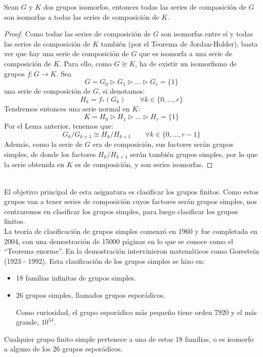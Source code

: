 \begin{prop}
    Sean $G$ y $K$ dos grupos isomorfos, entonces todas las series de composición de $G$ son isomorfas a todas las series de composición de $K$.
    \begin{proof}
        Como todas las series de composición de $G$ son isomorfas entre sí y todas las series de composición de $K$ también (por el Teorema de Jordan-Holder), basta ver que hay una serie de composición de $G$ que es isomorfa a una serie de composición de $K$. Para ello, como $G\cong K$, ha de existir un isomorfismo de grupos $f:G\to K$. Sea
        \begin{equation*}
            G = G_0 \rhd G_1 \rhd \ldots \rhd G_r = \{1\} 
        \end{equation*}
        una serie de composición de $G$, si denotamos:
        \begin{equation*}
            H_k = f_\ast(G_k) \qquad \forall k\in \{0,\ldots,r\}
        \end{equation*}
        Tendremos entonces una serie normal en $K$:
        \begin{equation*}
            K = H_0 \rhd H_1 \rhd \ldots \rhd H_r = \{1\}
        \end{equation*}
        Por el Lema anterior, tenemos que:
        \begin{equation*}
            G_k/G_{k+1} \cong H_k/H_{k+1} \qquad \forall k\in \{0,\ldots,r-1\}
        \end{equation*}
        Además, como la serie de $G$ era de composición, sus factores serán grupos simples, de donde los factores $H_k/H_{k+1}$ serán también grupos simples, por lo que la serie obtenida en $K$ es de composición, y son series isomorfas.
    \end{proof}
\end{prop}~\\

\noindent
El objetivo principal de esta asignatura es clasificar los grupos finitos. Como estos grupos van a tener series de composición cuyos factores serán grupos simples, nos centraremos en clasificar los grupos simples, para luego clasificar los grupos finitos.\\

\noindent
La teoría de clasificación de grupos simples comenzó en 1960 y fue completada en 2004, con una demostración de 15000 páginas en lo que se conoce como el ``Teorema enorme''. En la demostración intervinieron matemáticos como Gorestein (1923 - 1992). Esta clasificación de los grupos simples se hizo en:
\begin{itemize}
    \item 18 familias infinitas de grupos simples.
    \item 26 grupos simples, llamados grupos esporádicos. 

        Como curiosidad, el grupo esporádico más pequeño tiene orden 7920 y el más grande, $10^{54}$.
\end{itemize}
Cualquier grupo finito simple pertenece a una de estas 18 familias, o es isomorfo a alguno de los 26 grupos esporádicos.\\

